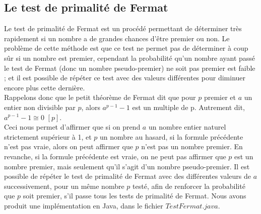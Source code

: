 		\subsection{Le test de primalité de Fermat}
			Le test de primalité de Fermat est un procédé permettant de déterminer très rapidement si un nombre a de grandes chances d'être premier ou non. Le problème de cette méthode est que ce test ne permet pas de déterminer à coup sûr si un nombre est premier, cependant la probabilité qu'un nombre ayant passé le test de Fermat (donc un nombre pseudo-premier) ne soit pas premier est faible ; et il est possible de répéter ce test avec des valeurs différentes pour diminuer encore plus cette dernière.\\
			Rappelons donc que le petit théorème de Fermat dit que pour $p$ premier et $a$ un entier non divisible par $p$, alors $a^{p-1} - 1$ est un multiple de p. Autrement dit, $a^{p-1}-1\cong{0}$ $[p]$.\\
			Ceci nous permet d'affirmer que si on prend $a$ un nombre entier naturel strictement supérieur à 1, et $p$ un nombre au hasard, si la formule précédente n'est pas vraie, alors on peut affirmer que $p$ n'est pas un nombre premier. En revanche, si la formule précédente est vraie, on ne peut pas affirmer que $p$ est un nombre premier, mais seulement qu'il s'agit d'un nombre pseudo-premier. Il est possible de répéter le test de primalité de Fermat avec des différentes valeurs de $a$ successivement, pour un même nombre $p$ testé, afin de renforcer la probabilité que $p$ soit premier, s'il passe tous les tests de primalité de Fermat. Nous avons produit une implémentation en Java, dans le fichier $TestFermat.java$.

